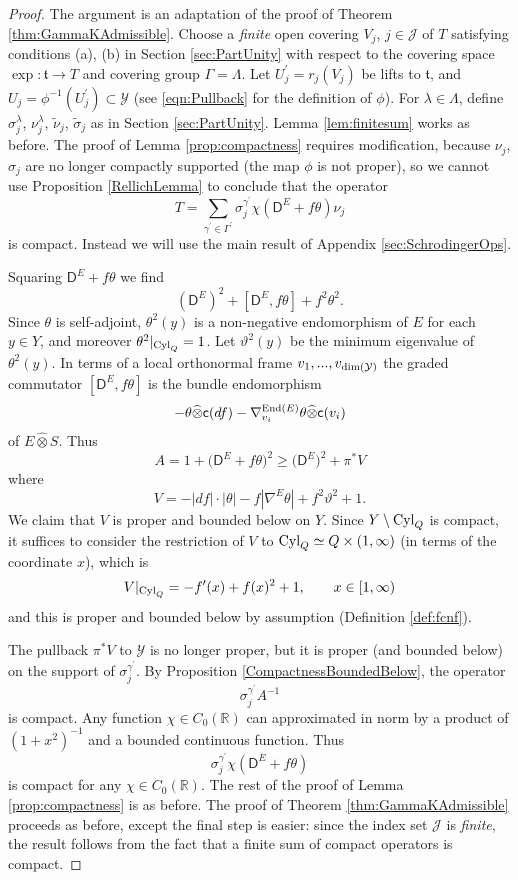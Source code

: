 \documentclass[11pt,reqno]{amsart}
\theoremstyle{definition}
\theoremstyle{remark}
\newcommand{\ti}[1]{\widetilde{#1}}
\newcommand{\wh}[1]{\widehat{#1}}
\newcommand{\st}[1]{\mathsf{#1}}
\def\t{\ensuremath{\mathfrak{t}}}
\def\Y{\ensuremath{\mathcal{Y}}}
\def\J{\ensuremath{\mathcal{J}}}
\def\c{\ensuremath{\mathsf{c}}}
\def\bR{\ensuremath{\mathbb{R}}}
\def\End{\ensuremath{\textnormal{End}}}
\def\dim{\ensuremath{\textnormal{dim}}}
\def\Cyl{\ensuremath{\textnormal{Cyl}}}
\begin{document}
\begin{proof}
The argument is an adaptation of the proof of Theorem \ref{thm:GammaKAdmissible}.  Choose a \emph{finite} open covering $V_j$, $j \in \J$ of $T$ satisfying conditions (a), (b) in Section \ref{sec:PartUnity} with respect to the covering space $\exp \colon \t \rightarrow T$ and covering group $\Gamma=\Lambda$.  Let $U_j^\prime=r_j(V_j)$ be lifts to $\t$, and $U_j=\phi^{-1}(U_j^\prime) \subset \Y$ (see \eqref{eqn:Pullback} for the definition of $\phi$).  For $\lambda \in \Lambda$, define $\sigma_j^{\lambda}$, $\nu_j^\lambda$, $\ti{\nu}_j$, $\ti{\sigma}_j$ as in Section \ref{sec:PartUnity}.  Lemma \ref{lem:finitesum} works as before.  The proof of Lemma \ref{prop:compactness} requires modification, because $\nu_j$, $\sigma_j$ are no longer compactly supported (the map $\phi$ is not proper), so we cannot use Proposition \ref{RellichLemma} to conclude that the operator
\[ T=\sum_{\gamma^\prime \in \Gamma^\prime}\sigma^{\gamma^\prime}_j \chi(\st{D}^E+f\theta) \nu_j \]
is compact.  Instead we will use the main result of Appendix \ref{sec:SchrodingerOps}.

Squaring $\st{D}^E+f\theta$ we find
\[ (\st{D}^E)^2+[\st{D}^E,f\theta]+f^2\theta^2. \]
Since $\theta$ is self-adjoint, $\theta^2(y)$ is a non-negative endomorphism of $E$ for each $y \in Y$, and moreover $\theta^2|_{\Cyl_Q}=1$.  Let $\vartheta^2(y)$ be the minimum eigenvalue of $\theta^2(y)$.  In terms of a local orthonormal frame $v_1,...,v_{\dim(\Y)}$ the graded commutator $[\st{D}^E,f\theta]$ is the bundle endomorphism
\[ -\theta \wh{\otimes} \c(df)-\nabla_{v_i}^{\End(E)}\theta \wh{\otimes}\c(v_i) \]
of $E\wh{\otimes}S$.  Thus
\[ A=1+\big(\st{D}^E+f\theta\big)^2 \ge \big(\st{D}^E\big)^2+\pi^\ast V \]
where
\[ V=-|df|\cdot |\theta|-f|\nabla^E\theta|+f^2\vartheta^2+1.\]
We claim that $V$ is proper and bounded below on $Y$.  Since $Y \setminus \Cyl_Q$ is compact, it suffices to consider the restriction of $V$ to $\Cyl_Q \simeq Q \times (1,\infty)$ (in terms of the coordinate $x$), which is  
\[ V|_{\Cyl_Q}=-f^\prime(x)+f(x)^2+1, \qquad x \in [1,\infty) \]
and this is proper and bounded below by assumption (Definition \ref{def:fcnf}).

The pullback $\pi^\ast V$ to $\Y$ is no longer proper, but it is proper (and bounded below) on the support of $\sigma_j^{\gamma^\prime}$.  By Proposition \ref{CompactnessBoundedBelow}, the operator
\[ \sigma_j^{\gamma^\prime} A^{-1} \]
is compact.  Any function $\chi \in C_0(\bR)$ can approximated in norm by a product of $(1+x^2)^{-1}$ and a bounded continuous function.  Thus
\[ \sigma_j^{\gamma^\prime}\chi(\st{D}^E+f\theta) \]
is compact for any $\chi \in C_0(\bR)$.  The rest of the proof of Lemma \ref{prop:compactness} is as before.  The proof of Theorem \ref{thm:GammaKAdmissible} proceeds as before, except the final step is easier: since the index set $\J$ is \emph{finite}, the result follows from the fact that a finite sum of compact operators is compact.
\end{proof}
\end{document}
